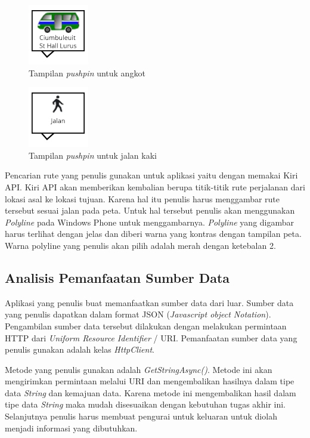 \begin{figure}[h]
	\centering
		\includegraphics[scale=0.5]{Gambar/out_kiri/angkot}
	\caption{Tampilan \textit{pushpin} untuk angkot}
	\label{fig:pushpin_angkot}
\end{figure}

\begin{figure}[h]
	\centering
		\includegraphics[scale=0.5]{Gambar/out_kiri/jalan}
	\caption{Tampilan \textit{pushpin} untuk jalan kaki}
	\label{fig:pushpin_jalan}
\end{figure}

\hspace{0.5cm} Pencarian rute yang penulis gunakan untuk aplikasi yaitu dengan memakai Kiri API. Kiri API akan memberikan kembalian berupa titik-titik rute perjalanan dari lokasi asal ke lokasi tujuan. Karena hal itu penulis harus menggambar rute tersebut sesuai jalan pada peta. Untuk hal tersebut penulis akan menggunakan \textit{Polyline} pada Windows Phone untuk menggambarnya. \textit{Polyline} yang digambar harus terlihat dengan jelas dan diberi warna yang kontras dengan tampilan peta. Warna polyline yang penulis akan pilih adalah merah dengan ketebalan 2.

\subsection{Analisis Pemanfaatan Sumber Data}
\label{lab:Analisis Pemanfaatan Sumber Data}
\hspace{0.5cm} Aplikasi yang penulis buat memanfaatkan sumber data dari luar. Sumber data yang penulis dapatkan dalam format JSON (\textit{Javascript object Notation}). Pengambilan sumber data tersebut dilakukan dengan melakukan permintaan HTTP dari \textit{Uniform Resource Identifier} / URI. Pemanfaatan sumber data yang penulis gunakan adalah kelas \textit{HttpClient}.

\hspace{0.5cm} Metode yang penulis gunakan adalah \textit{GetStringAsync()}. Metode ini akan mengirimkan permintaan melalui URI dan mengembalikan hasilnya dalam tipe data \textit{String} dan kemajuan data. Karena metode ini mengembalikan hasil dalam tipe data \textit{String} maka mudah disesuaikan dengan kebutuhan tugas akhir ini. Selanjutnya penulis harus membuat pengurai untuk keluaran  untuk diolah menjadi informasi yang dibutuhkan.   


